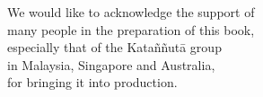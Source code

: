 
\cleartoverso
\begin{quotepage}{80mm}
\centering
We would like to acknowledge the support of\\
many people in the preparation of this book,\\
especially that of the Kataññutā group\\
in Malaysia, Singapore and Australia,\\
for bringing it into production.

\end{quotepage}

